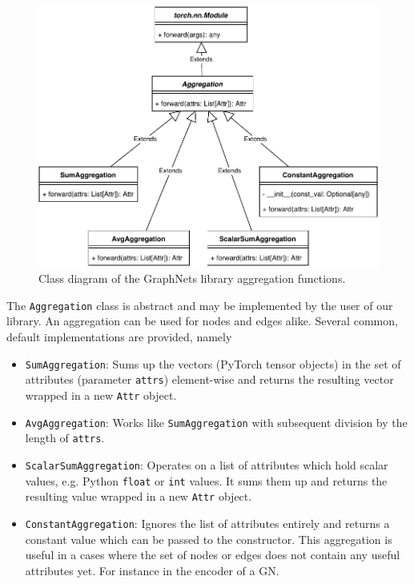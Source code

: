 \begin{figure}\centering
    \includegraphics[scale=0.65]{resources/graphnets-functions-aggr}
    \caption[Class diagram of the GraphNets library aggregation functions]{Class diagram of the GraphNets library aggregation functions.}\label{fig:classdiagramgnfunctionsaggr}
\end{figure}

The \texttt{Aggregation} class is abstract and may be implemented by the user of our library. An aggregation can be used for nodes and edges alike. Several common, default implementations are provided, namely

\begin{itemize}
    \item \texttt{SumAggregation}: Sums up the vectors (PyTorch tensor objects) in the set of attributes (parameter \texttt{attrs}) element-wise and returns the resulting vector wrapped in a new \texttt{Attr} object.
    \item \texttt{AvgAggregation}: Works like \texttt{SumAggregation} with subsequent division by the length of \texttt{attrs}.
    \item \texttt{ScalarSumAggregation}: Operates on a list of attributes which hold scalar values, e.g. Python \texttt{float} or \texttt{int} values. It sums them up and returns the resulting value wrapped in a new \texttt{Attr} object.
    \item \texttt{ConstantAggregation}: Ignores the list of attributes entirely and returns a constant value which can be passed to the constructor. This aggregation is useful in a cases where the set of nodes or edges does not contain any useful attributes yet. For instance in the encoder of a GN.
\end{itemize}

